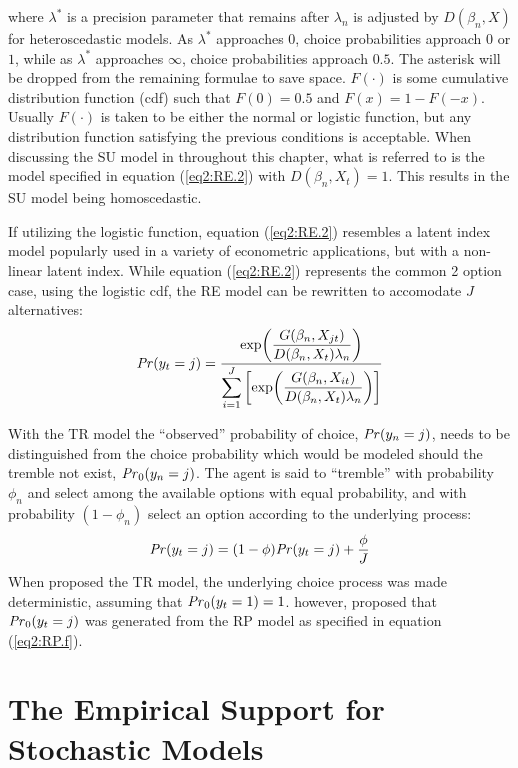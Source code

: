 \documentclass[../main.tex]{subfiles}
\begin{document}
\noindent where $\lambda^*$ is a precision parameter that remains after $\lambda_n$ is adjusted by $D(\beta_n,X)$ for heteroscedastic models.
As $\lambda^*$ approaches $0$, choice probabilities approach $0$ or $1$, while as $\lambda^*$ approaches $\infty$, choice probabilities approach $0.5$.
The asterisk will be dropped from the remaining formulae to save space.
$F(\cdot)$ is some cumulative distribution function (cdf) such that $F(0) = 0.5$ and $F(x) = 1 - F(-x)$.
Usually $F(\cdot)$ is taken to be either the normal or logistic function, but any distribution function satisfying the previous conditions is acceptable.
When discussing the SU model in throughout this chapter, what is referred to is the model specified in equation (\ref{eq2:RE.2}) with $D(\beta_n,X_t) = 1$.
This results in the SU model being homoscedastic.

If utilizing the logistic function, equation (\ref{eq2:RE.2}) resembles a latent index model popularly used in a variety of econometric applications, but with a non-linear latent index.
While equation (\ref{eq2:RE.2}) represents the common 2 option case, using the logistic cdf, the RE model can be rewritten to accomodate $J$ alternatives:
\begin{equation}
	\label{eq2:RE.f}
	{\ensuremath{\mathit{Pr}}}(y_t=j) =\dfrac{\exp\!\left( \dfrac{ G(\beta_n,X_{jt}) }{ D(\beta_n,X_{t})\lambda_n }  \right)}{ \displaystyle\sum_{i=1}^J \left[ \exp\!\left( \dfrac{ G(\beta_n,X_{it}) }{ D(\beta_n,X_{t})\lambda_n }  \right)  \right]  } 
\end{equation}

With the TR model the \enquote{observed} probability of choice, ${\mathit{Pr}}(y_n=j)$, needs to be distinguished from the choice probability which would be modeled should the tremble not exist, ${\mathit{Pr}}_0(y_n=j)$.
The agent is said to \enquote{tremble} with probability $\phi_n$ and select among the available options with equal probability, and with probability $(1-\phi_n)$ select an option according to the underlying process:
\begin{equation}
	\label{eq2:TR.f}
	{\ensuremath{\mathit{Pr}}}(y_t=j) = (1-\phi) {\mathit{Pr}}(y_t=j) + \frac{\phi}{J}
\end{equation}
When \textcite{Harless1994} proposed the TR model, the underlying choice process was made deterministic, assuming that ${\mathit{Pr}}_0(y_t=1) = 1$.
\textcite{Loomes2002} however, proposed that ${\mathit{Pr}}_0(y_t=j)$ was generated from the RP model as specified in equation (\ref{eq2:RP.f}).

\section{The Empirical Support for Stochastic Models}
\end{document}
